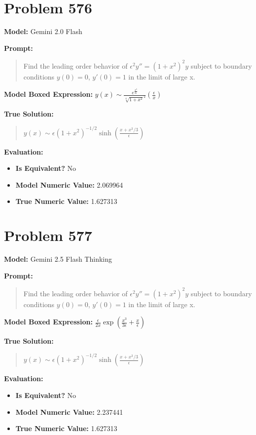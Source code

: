 \documentclass{article}
\begin{document}
\section*{Problem 576}
\textbf{Model:} Gemini 2.0 Flash

\textbf{Prompt:}
\begin{quote}
Find the leading order behavior of $\epsilon^2 y'' = (1+x^2)^2 y$ subject to boundary conditions $y(0) = 0$, $y'(0)= 1$ in the limit of large x.
\end{quote}
\textbf{Model Boxed Expression:} $y(x) \sim \frac{e^{\frac{x^3}{3\epsilon}}}{\sqrt[4]{1+x^2}^2}\left(\frac{\epsilon}{x}\right)$

\textbf{True Solution:}
\begin{quote}
$y(x) \sim \epsilon (1+x^2)^{-1/2} \sinh\left(\frac{x+x^3/3}{\epsilon}\right)$
\end{quote}

\textbf{Evaluation:}
\begin{itemize}
\item \textbf{Is Equivalent?} No
\item \textbf{Model Numeric Value:} 2.069964
\item \textbf{True Numeric Value:} 1.627313
\end{itemize}
\vspace{1cm}
\section*{Problem 577}
\textbf{Model:} Gemini 2.5 Flash Thinking

\textbf{Prompt:}
\begin{quote}
Find the leading order behavior of $\epsilon^2 y'' = (1+x^2)^2 y$ subject to boundary conditions $y(0) = 0$, $y'(0)= 1$ in the limit of large x.
\end{quote}
\textbf{Model Boxed Expression:} $\frac{\epsilon}{2x} \exp\left(\frac{x^3}{3\epsilon} + \frac{x}{\epsilon}\right)$

\textbf{True Solution:}
\begin{quote}
$y(x) \sim \epsilon (1+x^2)^{-1/2} \sinh\left(\frac{x+x^3/3}{\epsilon}\right)$
\end{quote}

\textbf{Evaluation:}
\begin{itemize}
\item \textbf{Is Equivalent?} No
\item \textbf{Model Numeric Value:} 2.237441
\item \textbf{True Numeric Value:} 1.627313
\end{itemize}
\vspace{1cm}
\end{document}
